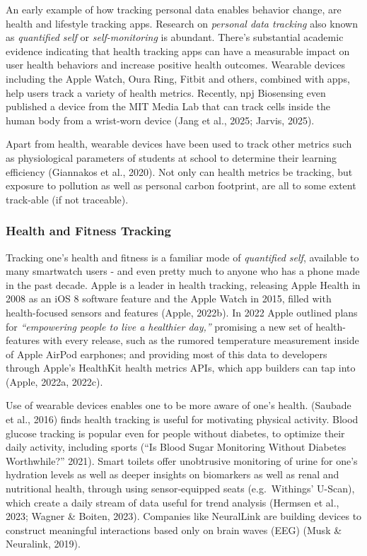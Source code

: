 \documentclass[
  12pt,
  letterpaper,
  DIV=11,
  numbers=noendperiod]{scrartcl}
\begin{document}
An early example of how tracking personal data enables behavior change,
are health and lifestyle tracking apps. Research on \emph{personal data
tracking} also known as \emph{quantified self} or \emph{self-monitoring}
is abundant. There's substantial academic evidence indicating that
health tracking apps can have a measurable impact on user health
behaviors and increase positive health outcomes. Wearable devices
including the Apple Watch, Oura Ring, Fitbit and others, combined with
apps, help users track a variety of health metrics. Recently, npj
Biosensing even published a device from the MIT Media Lab that can track
cells inside the human body from a wrist-worn device (Jang et al., 2025;
Jarvis, 2025).

Apart from health, wearable devices have been used to track other
metrics such as physiological parameters of students at school to
determine their learning efficiency (Giannakos et al., 2020). Not only
can health metrics be tracking, but exposure to pollution as well as
personal carbon footprint, are all to some extent track-able (if not
traceable).

\subsubsection{Health and Fitness
Tracking}\label{health-and-fitness-tracking}

Tracking one's health and fitness is a familiar mode of \emph{quantified
self}, available to many smartwatch users - and even pretty much to
anyone who has a phone made in the past decade. Apple is a leader in
health tracking, releasing Apple Health in 2008 as an iOS 8 software
feature and the Apple Watch in 2015, filled with health-focused sensors
and features (Apple, 2022b). In 2022 Apple outlined plans for
\emph{``empowering people to live a healthier day,''} promising a new
set of health-features with every release, such as the rumored
temperature measurement inside of Apple AirPod earphones; and providing
most of this data to developers through Apple's HealthKit health metrics
APIs, which app builders can tap into (Apple, 2022a, 2022c).

Use of wearable devices enables one to be more aware of one's health.
(Saubade et al., 2016) finds health tracking is useful for motivating
physical activity. Blood glucose tracking is popular even for people
without diabetes, to optimize their daily activity, including sports
({``Is Blood Sugar Monitoring Without Diabetes Worthwhile?''} 2021).
Smart toilets offer unobtrusive monitoring of urine for one's hydration
levels as well as deeper insights on biomarkers as well as renal and
nutritional health, through using sensor‐equipped seats (e.g.~Withings'
U-Scan), which create a daily stream of data useful for trend analysis
(Hermsen et al., 2023; Wagner \& Boiten, 2023). Companies like
NeuralLink are building devices to construct meaningful interactions
based only on brain waves (EEG) (Musk \& Neuralink, 2019).
\end{document}
